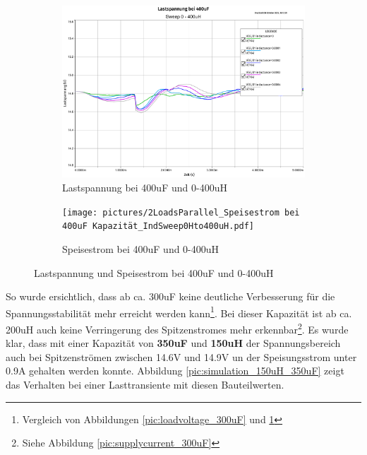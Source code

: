 \begin{figure}[H]
	\centering
	\begin{subfigure}{/13}
		\centering
		\includegraphics[width=\textwidth]{pictures/2LoadsParallel_Lastspannung bei 400uF_IndSweep0Hto400uH.pdf}
		\caption{Lastspannung bei 400uF und 0-400uH}
		\label{pic:loadvoltage_400uF}
	\end{subfigure}
	\hfill
	\begin{subfigure}{/13}
		\centering
		\texttt{[image: pictures/2LoadsParallel\_Speisestrom bei 400uF Kapazität\_IndSweep0Hto400uH.pdf]}
		\caption{Speisestrom bei 400uF und 0-400uH}
		\label{pic:supplycurrent_400uF}
	\end{subfigure}
	\caption{Lastspannung und Speisestrom bei 400uF und 0-400uH}
	\label{pic:supplycurrent_loadvoltage_400uF}
\end{figure}
So wurde ersichtlich, dass ab ca. 300uF keine deutliche Verbesserung für die Spannungsstabilität mehr erreicht werden kann\footnote{Vergleich von Abbildungen \ref{pic:loadvoltage_300uF} und \ref{pic:loadvoltage_400uF}}. Bei dieser Kapazität ist ab ca. 200uH auch keine Verringerung des Spitzenstromes mehr erkennbar\footnote{Siehe Abbildung \ref{pic:supplycurrent_300uF}}.
Es wurde klar, dass mit einer Kapazität von \textbf{350uF} und \textbf{150uH} der Spannungsbereich auch bei Spitzenströmen zwischen 14.6V und 14.9V un der Speisungsstrom unter 0.9A gehalten werden konnte. Abbildung \ref{pic:simulation_150uH_350uF} zeigt das Verhalten bei einer Lasttransiente mit diesen Bauteilwerten.\\
